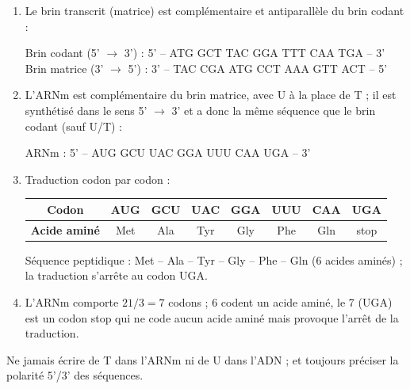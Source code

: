 \documentclass[11pt]{article}
\begin{document}
\begin{corrige}
\begin{enumerate}
\item Le brin transcrit (matrice) est complémentaire et antiparallèle du brin codant :
\begin{center}
Brin codant (5' $\rightarrow$ 3') : 5' -- ATG GCT TAC GGA TTT CAA TGA -- 3'\\
Brin matrice (3' $\rightarrow$ 5') : 3' -- TAC CGA ATG CCT AAA GTT ACT -- 5'
\end{center}
\item L'ARNm est complémentaire du brin matrice, avec U à la place de T ; il est synthétisé dans le sens 5' $\rightarrow$ 3' et a donc la même séquence que le brin codant (sauf U/T) :
\begin{center}
ARNm : 5' -- AUG GCU UAC GGA UUU CAA UGA -- 3'
\end{center}
\item Traduction codon par codon :
\begin{center}
\begin{tabular}{|c|c|c|c|c|c|c|c|}
\hline
\rowcolor{popblueL}
\textbf{Codon} & AUG & GCU & UAC & GGA & UUU & CAA & UGA \\
\hline
\textbf{Acide aminé} & Met & Ala & Tyr & Gly & Phe & Gln & stop \\
\hline
\end{tabular}
\end{center}
Séquence peptidique : Met -- Ala -- Tyr -- Gly -- Phe -- Gln (6 acides aminés) ; la traduction s'arrête au codon UGA.
\item L'ARNm comporte $21 / 3 = 7$ codons ; 6 codent un acide aminé, le 7 (UGA) est un codon stop qui ne code aucun acide aminé mais provoque l'arrêt de la traduction.
\end{enumerate}
\begin{attention}
Ne jamais écrire de T dans l'ARNm ni de U dans l'ADN ; et toujours préciser la polarité 5'/3' des séquences.
\end{attention}
\end{corrige}
\end{document}
